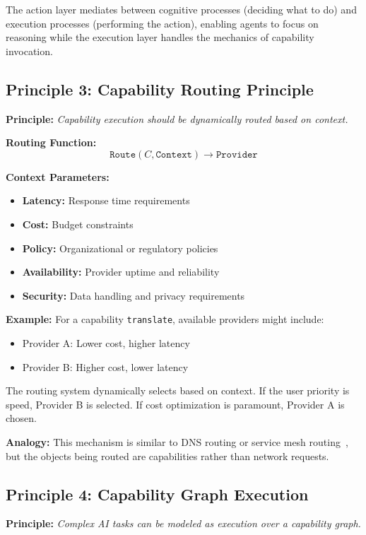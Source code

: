 The action layer mediates between cognitive processes (deciding what to do) and execution processes (performing the action), enabling agents to focus on reasoning while the execution layer handles the mechanics of capability invocation.

\subsection{Principle 3: Capability Routing Principle}

\textbf{Principle:} \emph{Capability execution should be dynamically routed based on context.}

\textbf{Routing Function:}
\[
\texttt{Route}(C, \texttt{Context}) \rightarrow \texttt{Provider}
\]

\textbf{Context Parameters:}
\begin{itemize}
    \item \textbf{Latency:} Response time requirements
    \item \textbf{Cost:} Budget constraints
    \item \textbf{Policy:} Organizational or regulatory policies
    \item \textbf{Availability:} Provider uptime and reliability
    \item \textbf{Security:} Data handling and privacy requirements
\end{itemize}

\textbf{Example:} For a capability \texttt{translate}, available providers might include:
\begin{itemize}
    \item Provider A: Lower cost, higher latency
    \item Provider B: Higher cost, lower latency
\end{itemize}

The routing system dynamically selects based on context. If the user priority is speed, Provider B is selected. If cost optimization is paramount, Provider A is chosen.

\textbf{Analogy:} This mechanism is similar to DNS routing or service mesh routing~\cite{consul2024}, but the objects being routed are capabilities rather than network requests.

\subsection{Principle 4: Capability Graph Execution}

\textbf{Principle:} \emph{Complex AI tasks can be modeled as execution over a capability graph.}

